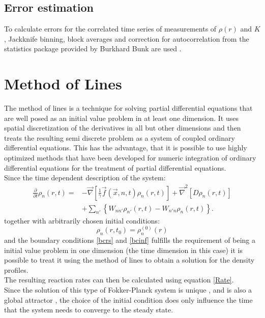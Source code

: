\subsection{Error estimation}
To calculate errors for the correlated time series of measurements of $\rho(r)$ and $K$, Jackknife binning, block averages and correction for autocorrelation from the statistics package provided by Burkhard Bunk are used \cite{bunk2006}.
\section{Method of Lines}
\label{method_of_lines}
The method of lines \cite{pregla1989, saucez2001} is a technique for solving partial differential equations that are well posed as an initial value problem in at least one dimension. It uses spatial discretization of the derivatives in all but other dimensions and then treats the resulting semi discrete problem as a system of coupled ordinary differential equations. This has the advantage, that it is possible to use highly optimized methods that have been developed for numeric integration of ordinary differential equations for the treatment of partial differential equations.\\
Since the time dependent description of the system: 
\begin{align}
    \frac{\partial}{\partial t } \rho_n(r,t) =   &- \vec{ \nabla } \left[\frac{1}{\gamma}\vec{f}(\vec{x},n,t)\rho_n(r,t) \right] +\vec{\nabla}^{2}\left[ D\rho_n(r,t) \right] \nonumber \\
    &+ \sum_{n'} \left\{ W_{nn'}\rho_{n'}(r,t) - W_{n'n}\rho_n(r,t)\right\}.
    \label{fpmeqmol}
\end{align}
together with arbitrarily chosen initial conditions:
\begin{equation}
    \rho_n(r,t_0) = \rho_n^{(0)}(r)
    \label{rho0mol}
\end{equation}
and the boundary conditions \eqref{bcrs} and \eqref{bcinf} fulfills the requirement of being a initial value problem in one dimension (the time dimension in this case) it is possible to treat it using the method of lines to obtain a solution for the density profiles.\\
The resulting reaction rates can then be calculated using equation \eqref{Rate}.\\
Since the solution of this type of Fokker-Planck system is unique \cite{soize1994}, and is also a global attractor \cite{Efendiev2000}, the choice of the initial condition does only influence the time that the system needs to converge to the steady state.\\
